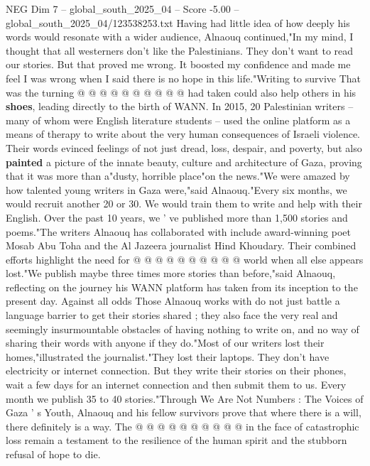 \begin{textsample}{NEG Dim 7 – global\_south\_2025\_04 – Score -5.00 – global\_south\_2025\_04/123538253.txt}
Having had little idea of how deeply his words would resonate with a wider audience, Alnaouq continued,"In my mind, I thought that all westerners don't like the Palestinians.
They don't want to read our stories.
But that proved me wrong.
It boosted my confidence and made me feel I was wrong when I said there is no hope in this life."Writing to survive That was the turning @ @ @ @ @ @ @ @ @ @ had taken could also help others in his \textbf{shoes}, leading directly to the birth of WANN.
In 2015, 20 Palestinian writers -- many of whom were English literature students -- used the online platform as a means of therapy to write about the very human consequences of Israeli violence.
Their words evinced feelings of not just dread, loss, despair, and poverty, but also \textbf{painted} a picture of the innate beauty, culture and architecture of Gaza, proving that it was more than a"dusty, horrible place"on the news."We were amazed by how talented young writers in Gaza were,"said Alnaouq."Every six months, we would recruit another 20 or 30.
We would train them to write and help with their English.
Over the past 10 years, we ' ve published more than 1,500 stories and poems."The writers Alnaouq has collaborated with include award-winning poet Mosab Abu Toha and the Al Jazeera journalist Hind Khoudary.
Their combined efforts highlight the need for @ @ @ @ @ @ @ @ @ @ world when all else appears lost."We publish maybe three times more stories than before,"said Alnaouq, reflecting on the journey his WANN platform has taken from its inception to the present day.
Against all odds Those Alnaouq works with do not just battle a language barrier to get their stories shared ; they also face the very real and seemingly insurmountable obstacles of having nothing to write on, and no way of sharing their words with anyone if they do."Most of our writers lost their homes,"illustrated the journalist."They lost their laptops.
They don't have electricity or internet connection.
But they write their stories on their phones, wait a few days for an internet connection and then submit them to us.
Every month we publish 35 to 40 stories."Through We Are Not Numbers : The Voices of Gaza ' s Youth, Alnaouq and his fellow survivors prove that where there is a will, there definitely is a way.
The @ @ @ @ @ @ @ @ @ @ in the face of catastrophic loss remain a testament to the resilience of the human spirit and the stubborn refusal of hope to die.

\end{textsample}
